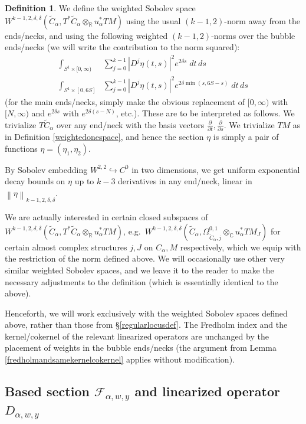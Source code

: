 \documentclass[12pt]{article}
\theoremstyle{definition}
\newtheorem{definition}[theorem]{Definition}
\theoremstyle{remark}
\numberwithin{equation}{subsection}
\newcommand{\F}{\mathcal F}
\newcommand{\CC}{\mathbb C}
\newcommand{\RR}{\mathbb R}
\begin{document}
\begin{definition}
We define the weighted Sobolev space $W^{k-1,2,\delta,\delta}(\tilde C_\alpha,T^\ast\tilde C_\alpha\otimes_\RR u_\alpha^\ast TM)$ using the usual $(k-1,2)$-norm away from the ends/necks, and using the following weighted $(k-1,2)$-norms over the bubble ends/necks (we will write the contribution to the norm squared):
\begin{align}
\int_{S^1\times[0,\infty)}&\sum_{j=0}^{k-1}\left|D^j\eta(t,s)\right|^2e^{2\delta s}\;dt\,ds\\
\int_{S^1\times[0,6S]}&\sum_{j=0}^{k-1}\left|D^j\eta(t,s)\right|^2e^{2\delta\min(s,6S-s)}\;dt\,ds
\end{align}
(for the main ends/necks, simply make the obvious replacement of $[0,\infty)$ with $[N,\infty)$ and $e^{2\delta s}$ with $e^{2\delta(s-N)}$, etc.).  These are to be interpreted as follows.  We trivialize $T\tilde C_\alpha$ over any end/neck with the basis vectors $\frac\partial{\partial t},\frac\partial{\partial s}$.  We trivialize $TM$ as in Definition \ref{weightedonespace}, and hence the section $\eta$ is simply a pair of functions $\eta=(\eta_1,\eta_2)$.

By Sobolev embedding $W^{2,2}\hookrightarrow C^0$ in two dimensions, we get uniform exponential decay bounds on $\eta$ up to $k-3$ derivatives in any end/neck, linear in $\left\|\eta\right\|_{k-1,2,\delta,\delta}$.

We are actually interested in certain closed subspaces of $W^{k-1,2,\delta,\delta}(\tilde C_\alpha,T^\ast\tilde C_\alpha\otimes_\RR u_\alpha^\ast TM)$, e.g.\ $W^{k-1,2,\delta,\delta}(\tilde C_\alpha,\Omega^{0,1}_{\tilde C_\alpha,j}\otimes_\CC u_\alpha^\ast TM_J)$ for certain almost complex structures $j,J$ on $C_\alpha,M$ respectively, which we equip with the restriction of the norm defined above.  We will occasionally use other very similar weighted Sobolev spaces, and we leave it to the reader to make the necessary adjustments to the definition (which is essentially identical to the above).
\end{definition}

Henceforth, we will work exclusively with the weighted Sobolev spaces defined above, rather than those from \S\ref{regularlocusdef}.  The Fredholm index and the kernel/cokernel of the relevant linearized operators are unchanged by the placement of weights in the bubble ends/necks (the argument from Lemma \ref{fredholmandsamekernelcokernel} applies without modification).

\subsection{Based section \texorpdfstring{$\F_{\alpha,w,y}$}{F\_alpha,w,y} and linearized operator \texorpdfstring{$D_{\alpha,w,y}$}{D\_alpha,w,y}}
\end{document}
